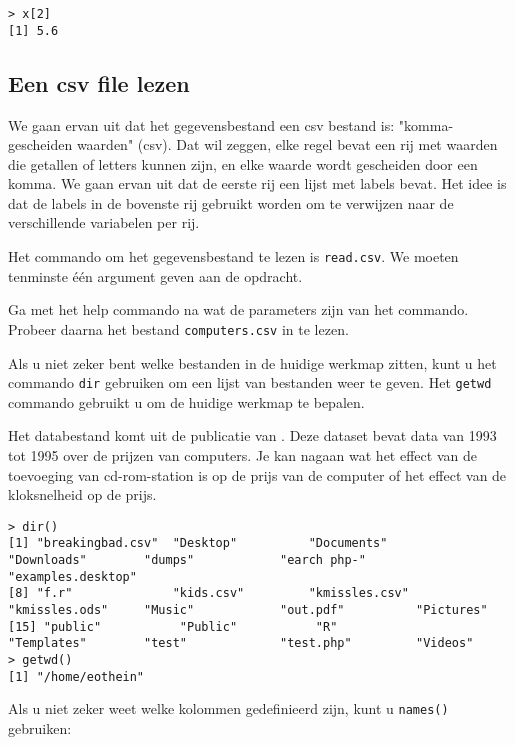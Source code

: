 \begin{lstlisting}
> x[2]
[1] 5.6
\end{lstlisting}

\subsection{Een csv file lezen}

We gaan ervan uit dat het gegevensbestand een csv bestand is: "komma-gescheiden waarden" (csv). Dat wil zeggen, elke regel bevat een rij met waarden die getallen of letters kunnen zijn, en elke waarde wordt gescheiden door een komma. We gaan ervan uit dat de eerste rij een lijst met labels bevat. Het idee is dat de labels in de bovenste rij gebruikt worden om te verwijzen naar de verschillende variabelen per rij.

Het commando om het gegevensbestand te lezen is \texttt{read.csv}. We moeten tenminste één argument geven aan de opdracht.

\begin{exercise}
  Ga met het help commando na wat de parameters zijn van het commando. Probeer daarna het bestand \texttt{computers.csv} in te lezen. 
\end{exercise}

Als u niet zeker bent welke bestanden in de huidige werkmap zitten, kunt u het commando \texttt{dir} gebruiken om een lijst van bestanden weer te geven. Het \texttt{getwd} commando gebruikt u om de huidige werkmap te bepalen.

Het databestand komt uit de publicatie van \autocite{Stengos2005}. Deze dataset bevat data van 1993 tot 1995 over de prijzen van computers. Je kan nagaan wat het effect van de toevoeging van cd-rom-station is op de prijs van de computer of  het effect van de kloksnelheid op de prijs. 

\begin{lstlisting}
> dir()
[1] "breakingbad.csv"  "Desktop"          "Documents"        "Downloads"        "dumps"            "earch php-"       "examples.desktop"
[8] "f.r"              "kids.csv"         "kmissles.csv"     "kmissles.ods"     "Music"            "out.pdf"          "Pictures"        
[15] "public"           "Public"           "R"                "Templates"        "test"             "test.php"         "Videos"          
> getwd()
[1] "/home/eothein"
\end{lstlisting}

Als u niet zeker weet welke kolommen gedefinieerd zijn, kunt u \texttt{names()} gebruiken:


